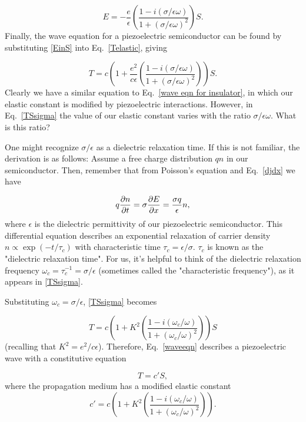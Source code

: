 \documentclass{beavtex_dub_edit}
\begin{document}
\begin{equation}
    E = -\frac{e}{\epsilon}\left(\frac{1-i(\sigma/\epsilon\omega)}{1+(\sigma/\epsilon\omega)^2}\right)S. \label{EinS}
\end{equation}
Finally, the wave equation for a piezoelectric semiconductor can be found by substituting \ref{EinS} into Eq.\ \ref{Telastic}, giving

\begin{equation}
    T = c\left(1 + \frac{e^2}{c\epsilon}\left(\frac{1-i(\sigma/\epsilon\omega)}{1+(\sigma/\epsilon\omega)^2}\right)\right)S. \label{TSsigma}
\end{equation}
Clearly we have a similar equation to Eq.\ \ref{wave eqn for insulator}, in which our elastic constant is modified by piezoelectric interactions. However, in Eq.\ \ref{TSsigma} the value of our elastic constant varies with the ratio $\sigma/\epsilon\omega$. What is this ratio?

One might recognize $\sigma/\epsilon$ as a dielectric relaxation time. If this is not familiar, the derivation is as follows: Assume a free charge distribution $qn$ in our semiconductor. Then, remember that from Poisson's equation and Eq.\ \ref{djdx} we have

\begin{equation}
    q\pdv{n}{t} = \sigma\pdv{E}{x} = \frac{\sigma q}{\epsilon}n, 
\end{equation}
where $\epsilon$ is the dielectric permittivity of our piezoelectric semiconductor. This differential equation describes an exponential relaxation of carrier density $n \propto \exp(-t/\tau_c)$ with characteristic time $\tau_c = \epsilon/\sigma$. $\tau_c$ is known as the "dielectric relaxation time". For us, it's helpful to think of the dielectric relaxation frequency $\omega_c = \tau_c^{-1} = \sigma/\epsilon$ (sometimes called the "characteristic frequency"), as it appears in \ref{TSsigma}. 

Substituting $\omega_c = \sigma/\epsilon$, \ref{TSsigma} becomes

\begin{equation}
    T = c\left(1 + K^2\left(\frac{1-i(\omega_c/\omega)}{1+(\omega_c/\omega)^2}\right)\right)S \label{waveeqn}
\end{equation}
(recalling that $K^2 = e^2/c\epsilon$). Therefore, Eq.\ \ref{waveeqn} describes a piezoelectric wave with a constitutive equation

\begin{equation}
    T = c' S,
    \label{waveeqn modified}
\end{equation}
where the propagation medium has a modified elastic constant
\begin{equation}
    c' = c\left(1 + K^2\left(\frac{1-i(\omega_c/\omega)}{1+(\omega_c/\omega)^2}\right)\right). \label{cprime}
\end{equation}
\end{document}
